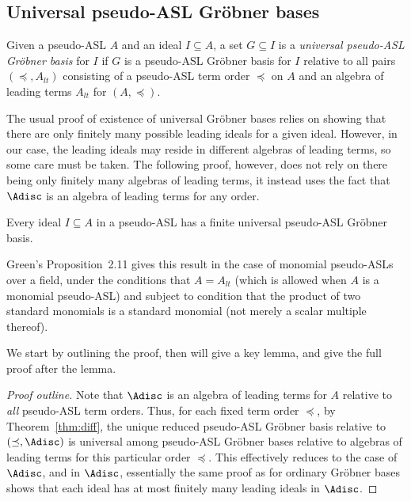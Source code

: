 \documentclass[11pt,reqno]{amsart}
\newcommand{\gb}{Gr\"{o}bner }
\theoremstyle{definition}
\numberwithin{equation}{section}
\begin{document}
\subsection{Universal pseudo-ASL Gröbner bases} \label{sec:universal}

\begin{definition}[store=defuniversalgb, note={Universal \gb basis}]
\label{def:universal-gb}
Given a pseudo-ASL $A$ and an ideal $I \subseteq A$, a set $G \subseteq I$ is a \emph{universal pseudo-ASL Gröbner basis} for $I$ if $G$ is a pseudo-ASL Gröbner basis for $I$ relative to all pairs $(\preceq, A_{lt})$ consisting of a pseudo-ASL term order $\preceq$ on $A$ and an algebra of leading terms $A_{lt}$ for $(A,\preceq)$.
\end{definition}

The usual proof of existence of universal Gröbner bases relies on showing that there are only finitely many possible leading ideals for a given ideal. However, in our case, the leading ideals may reside in different algebras of leading terms, so some care must be taken. The following proof, however, does not rely on there being only finitely many algebras of leading terms, it instead uses the fact that $\Adisc$ is an algebra of leading terms for any order.

\begin{theorem}[store=thmuniversal, note={Universal \gb bases}] \label{thm:universal}
Every ideal $I \subseteq A$ in a pseudo-ASL has a finite universal pseudo-ASL Gröbner basis.
\end{theorem}

Green's Proposition~2.11 \cite{green} gives this result in the case of monomial pseudo-ASLs over a field, under the conditions that $A = A_{lt}$ (which is allowed when $A$ is a monomial pseudo-ASL) and subject to condition that the product of two standard monomials is a standard monomial (not merely a scalar multiple thereof).

We start by outlining the proof, then will give a key lemma, and give the full proof after the lemma.

\begin{proof}[Proof outline]
Note that $\Adisc$ is an algebra of leading terms for $A$ relative to \emph{all} pseudo-ASL term orders. Thus, for each fixed term order $\preceq$, by Theorem~\ref{thm:diff}, the unique reduced pseudo-ASL Gröbner basis relative to $(\preceq, \Adisc)$ is universal among pseudo-ASL Gröbner bases relative to algebras of leading terms for this particular order $\preceq$. This effectively reduces to the case of $\Adisc$, and in $\Adisc$, essentially the same proof as for ordinary Gröbner bases shows that each ideal has at most finitely many leading ideals in $\Adisc$.
\end{proof}
\end{document}
